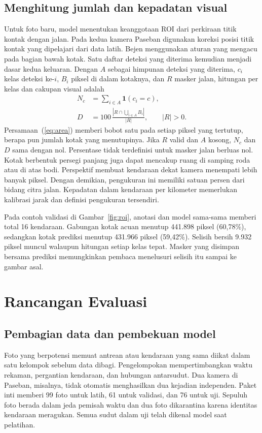 \documentclass[conference,a4paper]{IEEEtran}
\begin{document}
\subsection{Menghitung jumlah dan kepadatan visual}
Untuk foto baru, model menentukan keanggotaan ROI dari perkiraan titik kontak dengan jalan. Pada kedua kamera Paseban digunakan koreksi posisi titik kontak yang dipelajari dari data latih. Bejen menggunakan aturan yang mengacu pada bagian bawah kotak. Satu daftar deteksi yang diterima kemudian menjadi dasar kedua keluaran. Dengan $A$ sebagai himpunan deteksi yang diterima, $c_i$ kelas deteksi ke-$i$, $B_i$ piksel di dalam kotaknya, dan $R$ masker jalan, hitungan per kelas dan cakupan visual adalah
\begin{align}
N_c &= \sum_{i\in A}\mathbf{1}(c_i=c), \label{eq:count}\\
D &= 100\,\frac{\left|R\cap\bigcup_{i\in A}B_i\right|}{|R|},\qquad |R|>0. \label{eq:area}
\end{align}
Persamaan~(\ref{eq:area}) memberi bobot satu pada setiap piksel yang tertutup, berapa pun jumlah kotak yang menutupinya. Jika $R$ valid dan $A$ kosong, $N_c$ dan $D$ sama dengan nol. Persentase tidak terdefinisi untuk masker jalan berluas nol. Kotak berbentuk persegi panjang juga dapat mencakup ruang di samping roda atau di atas bodi. Perspektif membuat kendaraan dekat kamera menempati lebih banyak piksel. Dengan demikian, pengukuran ini memiliki satuan persen dari bidang citra jalan. Kepadatan dalam kendaraan per kilometer memerlukan kalibrasi jarak dan definisi pengukuran tersendiri.

Pada contoh validasi di Gambar~\ref{fig:roi}, anotasi dan model sama-sama memberi total 16 kendaraan. Gabungan kotak acuan menutup 441.898 piksel (60,78\%), sedangkan kotak prediksi menutup 431.966 piksel (59,42\%). Selisih bersih 9.932 piksel muncul walaupun hitungan setiap kelas tepat. Masker yang disimpan bersama prediksi memungkinkan pembaca menelusuri selisih itu sampai ke gambar asal.

\section{Rancangan Evaluasi}
\subsection{Pembagian data dan pembekuan model}
Foto yang berpotensi memuat antrean atau kendaraan yang sama diikat dalam satu kelompok sebelum data dibagi. Pengelompokan mempertimbangkan waktu rekaman, pergantian kendaraan, dan hubungan antarsudut. Dua kamera di Paseban, misalnya, tidak otomatis menghasilkan dua kejadian independen. Paket inti memberi 99 foto untuk latih, 61 untuk validasi, dan 76 untuk uji. Sepuluh foto berada dalam jeda pemisah waktu dan dua foto dikarantina karena identitas kendaraan meragukan. Semua sudut dalam uji telah dikenal model saat pelatihan.
\end{document}
